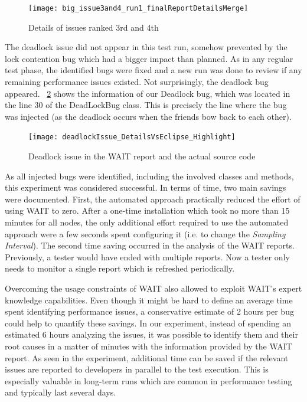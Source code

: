 \documentclass[runningheads,a4paper]{llncs}
\begin{document}
\begin{figure}[!h]
\centering
\texttt{[image: big\_issue3and4\_run1\_finalReportDetailsMerge]}
\caption{Details of issues ranked 3rd and 4th}
\label{fig_issues34}
\end{figure}

The deadlock issue did not appear in this test run, somehow prevented by the
lock contention bug which had a bigger impact than planned. As in any regular
test phase, the identified bugs were fixed and a new run was done to review
if any remaining performance issues existed. Not surprisingly, the deadlock bug
appeared. \figurename ~\ref{fig_dlissue_vs_code} shows the information of our
Deadlock bug, which was located in the line 30 of the DeadLockBug class. This is
precisely the line where the bug was injected (as the deadlock occurs when the
friends bow back to each other).
\begin{figure}[!h]
\centering
\texttt{[image: deadlockIssue\_DetailsVsEclipse\_Highlight]}
\caption{Deadlock issue in the WAIT report and the actual source code}
\label{fig_dlissue_vs_code}
\end{figure}


As all injected bugs were identified, including the involved classes and
methods, this experiment was considered successful. In terms of time, two main
savings were documented. First, the automated approach practically reduced the
effort of using WAIT to zero. After a one-time installation which took no more
than 15 minutes for all nodes, the only additional effort required to use the
automated approach were a few seconds spent configuring it (i.e. to change the
\emph{Sampling Interval}). The second time saving occurred in the analysis of the 
WAIT reports. Previously, a tester would have ended with multiple reports. Now a 
tester only needs to monitor a single report which is refreshed periodically.

Overcoming the usage constraints of WAIT also allowed to exploit
WAIT's expert knowledge capabilities. Even though it might be hard to define an
average time spent identifying performance issues, a conservative estimate of
2 hours per bug could help to quantify these savings. In our experiment,
instead of spending an estimated 6 hours analyzing the issues, it was
possible to identify them and their root causes in a matter of minutes with the 
information provided by the WAIT report. As seen in the experiment, additional
time can be saved if the relevant issues are reported to developers in parallel to
the test execution. This is especially valuable in long-term runs which
are common in performance testing and typically last several days.
\end{document}
